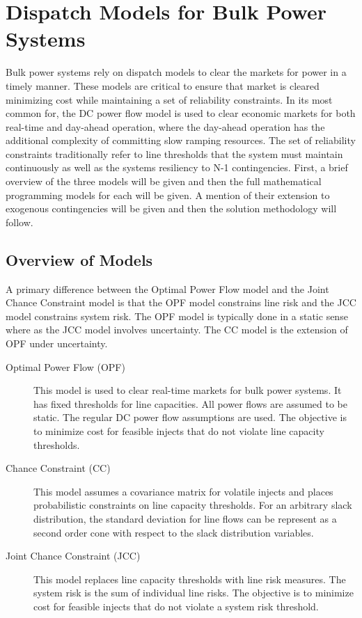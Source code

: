\section{Dispatch Models for Bulk Power Systems}
Bulk power systems rely on dispatch models to clear the markets for power in a timely manner.  These models are critical to ensure that market is cleared minimizing cost while maintaining a set of reliability constraints.  In its most common for, the DC power flow model is used to clear economic markets for both real-time and day-ahead operation, where the day-ahead operation has the additional complexity of committing slow ramping resources.  The set of reliability constraints traditionally refer to line thresholds that the system must maintain continuously as well as the systems resiliency to N-1 contingencies.  First, a brief overview of the three models will be given and then the full mathematical programming models for each will be given.  A mention of their extension to exogenous contingencies will be given and then the solution methodology will follow.

\subsection{Overview of Models}
A primary difference between the Optimal Power Flow model and the Joint Chance Constraint model is that the OPF model constrains line risk and the JCC model constrains system risk.  The OPF model is typically done in a static sense where as the JCC model involves uncertainty. The CC model is the extension of OPF under uncertainty.
\begin{description}
\item[Optimal Power Flow (OPF)] This model is used to clear real-time markets for bulk power systems.  It has fixed thresholds for line capacities.  All power flows are assumed to be static.  The regular DC power flow assumptions are used.  The objective is to minimize cost for feasible injects that do not violate line capacity thresholds.
\item[Chance Constraint (CC)] This model assumes a covariance matrix for volatile injects and places probabilistic constraints on line capacity thresholds.  For an arbitrary slack distribution, the standard deviation for line flows can be represent as a second order cone with respect to the slack distribution variables.
\item[Joint Chance Constraint (JCC)] This model replaces line capacity thresholds with line risk measures.  The system risk is the sum of individual line risks.  The objective is to minimize cost for feasible injects that do not violate a system risk threshold.
\end{description}


